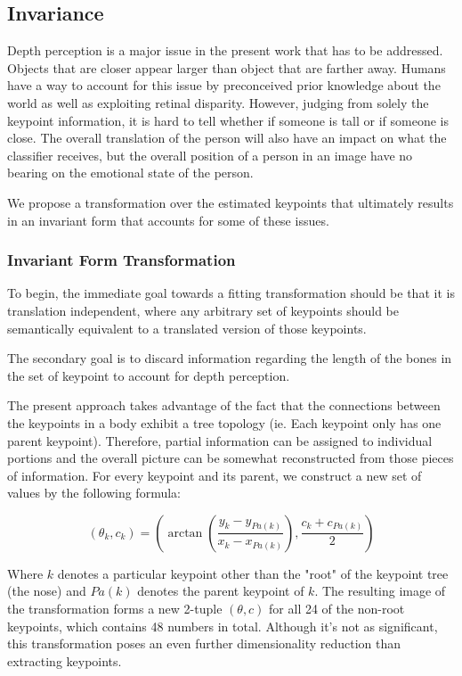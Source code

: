\documentclass{article}
\begin{document}
\subsection{Invariance}
Depth perception is a major issue in the present work that has to be addressed. Objects that are closer appear larger than object that are farther away. Humans have a way to account for this issue by preconceived prior knowledge about the world as well as exploiting retinal disparity. However, judging from solely the keypoint information, it is hard to tell whether if someone is tall or if someone is close. The overall translation of the person will also have an impact on what the classifier receives, but the overall position of a person in an image have no bearing on the emotional state of the person.

We propose a transformation over the estimated keypoints that ultimately results in an invariant form that accounts for some of these issues.

\subsubsection{Invariant Form Transformation}

To begin, the immediate goal towards a fitting transformation should be that it is translation independent, where any arbitrary set of keypoints should be semantically equivalent to a translated version of those keypoints.

The secondary goal is to discard information regarding the length of the bones in the set of keypoint to account for depth perception.

The present approach takes advantage of the fact that the connections between the keypoints in a body exhibit a tree topology (ie. Each keypoint only has one parent keypoint). Therefore, partial information can be assigned to individual portions and the overall picture can be somewhat reconstructed from those pieces of information. For every keypoint and its parent, we construct a new set of values by the following formula:

$$
(\theta_k,c_k) = \left(\arctan \left(\frac{y_k -y_{Pa(k)}}{x_k -x_{Pa(k)}} \right), \frac{c_k + c_{Pa(k)}}{2}\right)
$$

Where $k$ denotes a particular keypoint other than the "root" of the keypoint tree (the nose) and $Pa(k)$ denotes the parent keypoint of $k$. The resulting image of the transformation forms a new 2-tuple $(\theta, c)$ for all 24 of the non-root keypoints, which contains 48 numbers in total. Although it's not as significant, this transformation poses an even further dimensionality reduction than extracting keypoints.
\end{document}
